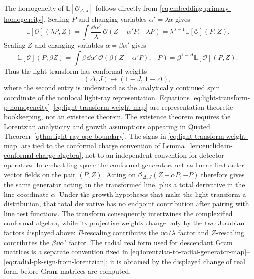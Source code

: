 The homogeneity of \(\mathbb L[\mathcal O_{\Delta,J}]\) follows directly from
\eqref{eq:embedding-primary-homogeneity}.  Scaling \(P\) and changing
variables \(\alpha'=\lambda\alpha\) gives
\begin{equation}
  \mathbb L[\mathcal O](\lambda P,Z)
  =
  \int\frac{\dd\alpha'}{\lambda}\,
  \mathcal O(Z-\alpha'P,-\lambda P)
  =
  \lambda^{J-1}\mathbb L[\mathcal O](P,Z).
  \label{eq:light-transform-p-homogeneity}
\end{equation}
Scaling \(Z\) and changing variables \(\alpha=\beta\alpha'\) gives
\begin{equation}
  \mathbb L[\mathcal O](P,\beta Z)
  =
  \int\beta\,\dd\alpha'\,
  \mathcal O(\beta(Z-\alpha'P),-P)
  =
  \beta^{1-\Delta}\mathbb L[\mathcal O](P,Z).
  \label{eq:light-transform-z-homogeneity}
\end{equation}
Thus the light transform has conformal weights
\begin{equation}
  (\Delta,J)
  \longmapsto
  (1-J,\,1-\Delta),
  \label{eq:light-transform-weight-map}
\end{equation}
where the second entry is understood as the analytically continued spin
coordinate of the nonlocal light-ray representation.  Equations
\eqref{eq:light-transform-p-homogeneity}--\eqref{eq:light-transform-weight-map}
are representation-theoretic bookkeeping, not an existence theorem.  The
existence theorem requires the Lorentzian analyticity and growth assumptions
appearing in Quoted Theorem~\ref{qthm:light-ray-ope-boundary}.
The signs in \eqref{eq:light-transform-weight-map} are tied to the conformal
charge convention of Lemma~\ref{lem:euclidean-conformal-charge-algebra}, not
to an independent convention for detector operators.  In embedding space the
conformal generators act as linear first-order vector fields on the pair
\((P,Z)\).  Acting on
\(\mathcal O_{\Delta,J}(Z-\alpha P,-P)\) therefore gives the same generator
acting on the transformed line, plus a total derivative in the line coordinate
\(\alpha\).  Under the growth hypotheses that make the light transform a
distribution, that total derivative has no endpoint contribution after
pairing with line test functions.  The transform consequently intertwines the
complexified conformal algebra, while its projective weights change only by
the two Jacobian factors displayed above: \(P\)-rescaling contributes the
\(\dd\alpha/\lambda\) factor and \(Z\)-rescaling contributes the
\(\beta\,\dd\alpha'\) factor.  The radial real form used for descendant Gram
matrices is a separate convention fixed in
\eqref{eq:lorentzian-to-radial-generator-map}--\eqref{eq:radial-pk-sign-from-lorentzian};
it is obtained by the displayed change of real form before Gram matrices are
computed.

